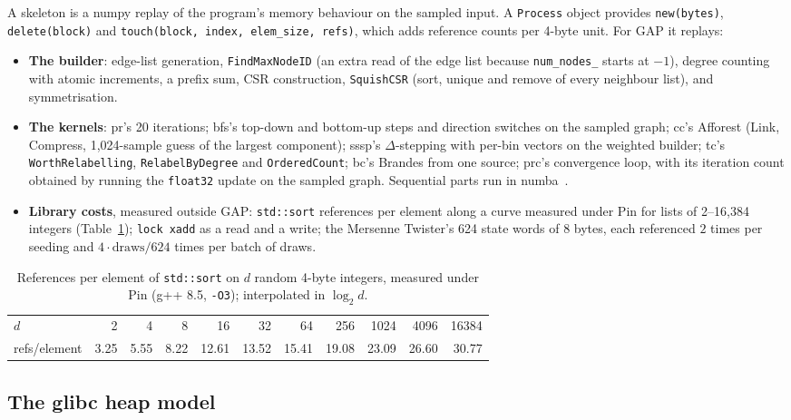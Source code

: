 \documentclass[11pt]{article}
\newcommand{\code}[1]{\texttt{#1}}
\newcommand{\tabref}[1]{Table~\ref{#1}}
\begin{document}
A skeleton is a numpy replay of the program's memory behaviour on the sampled input. A \code{Process} object provides
\code{new(bytes)}, \code{delete(block)} and \code{touch(block, index, elem\_size, refs)}, which adds reference counts
per 4-byte unit. For GAP it replays:
\begin{itemize}
\item \textbf{The builder}: edge-list generation, \code{FindMaxNodeID} (an extra read of the edge list because
\code{num\_nodes\_} starts at $-1$), degree counting with atomic increments, a prefix sum, CSR construction,
\code{SquishCSR} (sort, unique and remove of every neighbour list), and symmetrisation.
\item \textbf{The kernels}: pr's 20 iterations; bfs's top-down and bottom-up steps and direction switches on the
sampled graph; cc's Afforest (Link, Compress, 1{,}024-sample guess of the largest component); sssp's
$\Delta$-stepping with per-bin vectors on the weighted builder; tc's \code{WorthRelabelling},
\code{RelabelByDegree} and \code{OrderedCount}; bc's Brandes from one source; prc's convergence loop, with its
iteration count obtained by running the \code{float32} update on the sampled graph. Sequential parts run in
numba~\cite{lam2015numba}.
\item \textbf{Library costs}, measured outside GAP: \code{std::sort} references per element along a curve measured
under Pin for lists of 2--16{,}384 integers (\tabref{tab:sortrefs}); \code{lock xadd} as a read and a write; the
Mersenne Twister's 624 state words of 8 bytes, each referenced $2$ times per seeding and $4\cdot\text{draws}/624$ times
per batch of draws.
\end{itemize}

\begin{table}[!htbp]
\centering\small
\caption[Measured references per element of \code{std::sort}]{References per element of \code{std::sort} on $d$
random 4-byte integers, measured under Pin (g++ 8.5, \code{-O3}); interpolated in $\log_2 d$.}
\label{tab:sortrefs}
\begin{tabular}{l*{10}{r}}
\toprule
$d$ & 2 & 4 & 8 & 16 & 32 & 64 & 256 & 1024 & 4096 & 16384 \\
refs/element & 3.25 & 5.55 & 8.22 & 12.61 & 13.52 & 15.41 & 19.08 & 23.09 & 26.60 & 30.77 \\
\bottomrule
\end{tabular}
\end{table}

\subsection{The glibc heap model}
\end{document}
